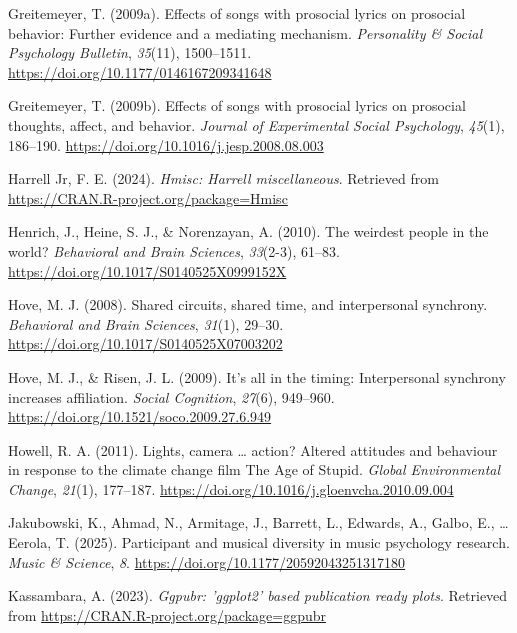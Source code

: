 \documentclass[
  man,floatsintext]{apa6}
\newlength{\cslhangindent}
\newenvironment{CSLReferences}[2] %
 {\begin{list}{}{%
  \setlength{\itemindent}{0pt}
  \setlength{\leftmargin}{0pt}
  \setlength{\parsep}{0pt}
  \ifodd #1
   \setlength{\leftmargin}{\cslhangindent}
   \setlength{\itemindent}{-1\cslhangindent}
  \fi
  \setlength{\itemsep}{#2\baselineskip}}}
 {\end{list}}
\begin{document}
\begin{CSLReferences}{1}{0}
Greitemeyer, T. (2009a). Effects of songs with prosocial lyrics on prosocial behavior: Further evidence and a mediating mechanism. \emph{Personality \& Social Psychology Bulletin}, \emph{35}(11), 1500--1511. \url{https://doi.org/10.1177/0146167209341648}

Greitemeyer, T. (2009b). Effects of songs with prosocial lyrics on prosocial thoughts, affect, and behavior. \emph{Journal of Experimental Social Psychology}, \emph{45}(1), 186--190. \url{https://doi.org/10.1016/j.jesp.2008.08.003}

Harrell Jr, F. E. (2024). \emph{Hmisc: Harrell miscellaneous}. Retrieved from \url{https://CRAN.R-project.org/package=Hmisc}

Henrich, J., Heine, S. J., \& Norenzayan, A. (2010). The weirdest people in the world? \emph{Behavioral and Brain Sciences}, \emph{33}(2-3), 61--83. \url{https://doi.org/10.1017/S0140525X0999152X}

Hove, M. J. (2008). Shared circuits, shared time, and interpersonal synchrony. \emph{Behavioral and Brain Sciences}, \emph{31}(1), 29--30. \url{https://doi.org/10.1017/S0140525X07003202}

Hove, M. J., \& Risen, J. L. (2009). It's all in the timing: {Interpersonal} synchrony increases affiliation. \emph{Social Cognition}, \emph{27}(6), 949--960. \url{https://doi.org/10.1521/soco.2009.27.6.949}

Howell, R. A. (2011). Lights, camera \ldots{} action? {Altered} attitudes and behaviour in response to the climate change film {The} {Age} of {Stupid}. \emph{Global Environmental Change}, \emph{21}(1), 177--187. \url{https://doi.org/10.1016/j.gloenvcha.2010.09.004}

Jakubowski, K., Ahmad, N., Armitage, J., Barrett, L., Edwards, A., Galbo, E., \ldots{} Eerola, T. (2025). Participant and musical diversity in music psychology research. \emph{Music \& Science}, \emph{8}. \url{https://doi.org/10.1177/20592043251317180}

Kassambara, A. (2023). \emph{Ggpubr: 'ggplot2' based publication ready plots}. Retrieved from \url{https://CRAN.R-project.org/package=ggpubr}


\end{CSLReferences}
\end{document}
